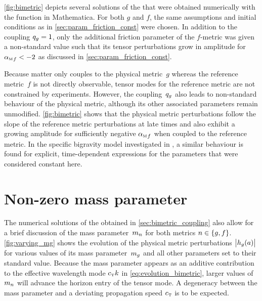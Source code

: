 \documentclass[12pt,parskip=half]{scrreprt}
\begin{document}
\autoref{fig:bimetric} depicts several solutions of the  that were obtained numerically with the  function in Mathematica. For both \(g\) and \(f\), the same assumptions and initial conditions as in \autoref{sec:param_friction_const} were chosen. In addition to the coupling \(q_{g}=1\), only the additional friction parameter of the \(f\)-metric was given a non-standard value such that its tensor perturbations grow in amplitude for \({\alpha_{\textnormal{\tiny{M}}}}_{f} < -2\) as discussed in \autoref{sec:param_friction_const}.


Because matter only couples to the physical metric~\(g\) whereas the reference metric~\(f\) is not directly observable, tensor modes for the reference metric are not constrained by experiments. However, the coupling~\(q_{g}\) also leads to non-standard behaviour of the physical metric, although its other associated parameters remain unmodified. \autoref{fig:bimetric} shows that the physical metric perturbations follow the slope of the reference metric perturbations at late times and also exhibit a growing amplitude for sufficiently negative \({\alpha_{\textnormal{\tiny{M}}}}_{f}\) when coupled to the reference metric. In the specific bigravity model investigated in \cite{Amendola2015}, a similar behaviour is found for explicit, time-dependent expressions for the parameters that were considered constant here. 


\section{Non-zero mass parameter}

The numerical solutions of the  obtained in \autoref{sec:bimetric_coupling} also allow for a brief discussion of the mass parameter~\(m_{n}\) for both metrics \(n \in \cbr{g,f}\). \autoref{fig:varying_mg} shows the evolution of the physical metric perturbations~\(\abs{h_{g}(a)}\) for various values of its mass parameter~\(m_{g}\) and all other parameters set to their standard value. Because the mass parameter appears as an additive contribution to the effective wavelength mode \({c_{\textnormal{\tiny{T}}}} k\) in \eqref{eq:evolution_bimetric}, larger values of \(m_{n}\) will advance the horizon entry of the tensor mode. A degeneracy between the mass parameter and a deviating propagation speed \({c_{\textnormal{\tiny{T}}}}\) is to be expected. 
\end{document}
